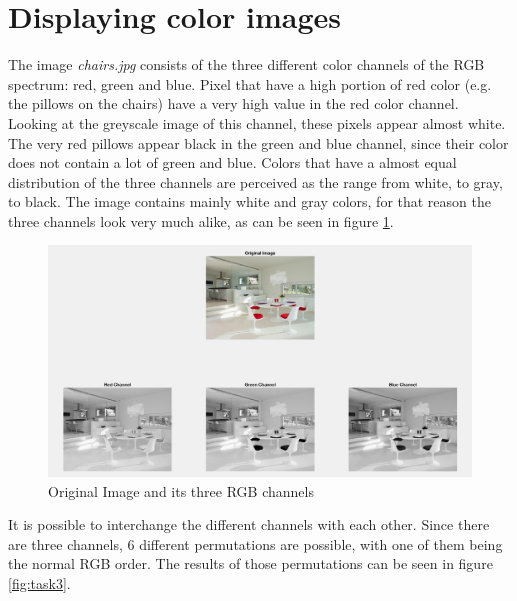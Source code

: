 \section{Displaying color images}

The image \textit{chairs.jpg} consists of the three different color channels of the RGB spectrum: red, green and blue. Pixel that have a high portion of red color (e.g. the pillows on the chairs) have a very high value in the red color channel. Looking at the greyscale image of this channel, these pixels appear almost white. The very red pillows appear black in the green and blue channel, since their color does not contain a lot of green and blue. Colors that have a almost equal distribution of the three channels are perceived as the range from white, to gray, to black. The image contains mainly white and gray colors, for that reason the three channels look very much alike, as can be seen in figure \ref{fig:task2}.

\begin{figure}[!hbt]
  \includegraphics[width=\textwidth]{./img/task2.png}
  \caption{Original Image and its three RGB channels}
  \label{fig:task2}
\end{figure}

It is possible to interchange the different channels with each other. Since there are three channels, 6 different permutations are possible, with one of them being the normal RGB order. The results of those permutations can be seen in figure \ref{fig:task3}.

